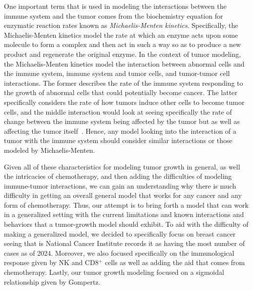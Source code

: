 \documentclass[11pt]{amsart}
\begin{document}
One important term that is used in modeling the interactions between the immune system and the tumor comes from the biochemistry equation for enzymatic reaction rates known as \textit{Michaelis-Menten kinetics}.
Specifically, the Michaelis-Menten kinetics model the rate at which an enzyme acts upon some molecule to form a complex and then act in such a way so as to produce a new product and regenerate the original enzyme.
In the context of tumor modeling, the Michaelis-Menten kinetics model the interaction between abnormal cells and the immune system, immune system and tumor cells, and tumor-tumor cell interactions.
The former describes the rate of the immune system responding to the growth of abnormal cells that could potentially become cancer.
The latter specifically considers the rate of how tumors induce other cells to become tumor cells, and the middle interaction would look at seeing specifically the rate of change between the immune system being affected by the tumor but as well as affecting the tumor itself\ \cite{math8081285}.
Hence, any model looking into the interaction of a tumor with the immune system should consider similar interactions or those modeled by Michaelis-Menten.


Given all of these characteristics for modeling tumor growth in general, as well the intricacies of chemotherapy, and then adding the difficulties of modeling immune-tumor interactions, we can gain an understanding why there is much difficulty in getting an overall general model that works for any cancer and any form of chemotherapy.
Thus, our attempt is to bring forth a model that can work in a generalized setting with the current limitations and known interactions and behaviors that a tumor-growth model should exhibit. 
To aid with the difficulty of making a generalized model, we decided to specifically focus on breast cancer seeing that is National Cancer Institute records it as having the most number of cases as of 2024.
Moreover, we also focused specifically on the immunological response given by NK and CD8$^+$ cells as well as adding the aid that comes from chemotherapy.
Lastly, our tumor growth modeling focused on a sigmoidal relationship given by Gompertz.
\end{document}
